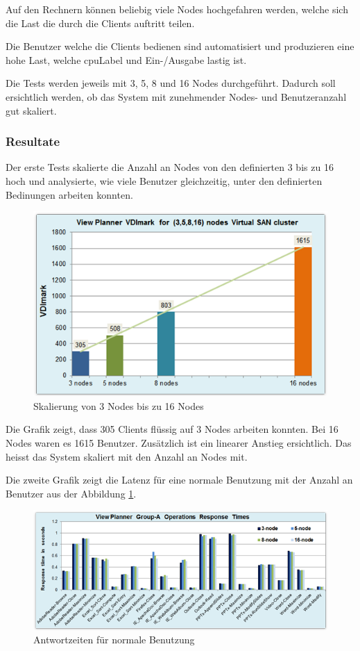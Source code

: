 Auf den Rechnern können beliebig viele Nodes hochgefahren werden, welche sich die Last die durch die Clients auftritt teilen.

Die Benutzer welche die Clients bedienen sind automatisiert und produzieren eine hohe Last, welche \Gls{cpuLabel} und Ein-/Ausgabe lastig ist.

Die Tests werden jeweils mit 3, 5, 8 und 16 Nodes durchgeführt. Dadurch soll ersichtlich werden, ob das System mit zunehmender Nodes- und Benutzeranzahl gut skaliert.

\subsubsection{Resultate}
Der erste Tests skalierte die Anzahl an Nodes von den definierten 3 bis zu 16 hoch und analysierte, wie viele Benutzer gleichzeitig, unter den definierten Bedinungen arbeiten konnten.

\begin{figure}[H]
	\includegraphics[width=\textwidth]{images/vmware-vdm-scale}
	\caption{Skalierung von 3 Nodes bis zu 16 Nodes}
	\label{fig:vdmPerformanceScale}
\end{figure}

Die Grafik zeigt, dass 305 Clients flüssig auf 3 Nodes arbeiten konnten. Bei 16 Nodes waren es 1615 Benutzer. Zusätzlich ist ein linearer Anstieg ersichtlich. Das heisst das System skaliert mit den Anzahl an Nodes mit.

Die zweite Grafik zeigt die Latenz für eine normale Benutzung mit der Anzahl an Benutzer aus der Abbildung \ref{fig:vdmPerformanceScale}.
\begin{figure}[H]
	\includegraphics[width=\textwidth]{images/vmware-vdm-performance-normal}
	\caption{Antwortzeiten für normale Benutzung}
	\label{fig:vdmPerformanceNormal}
\end{figure}

